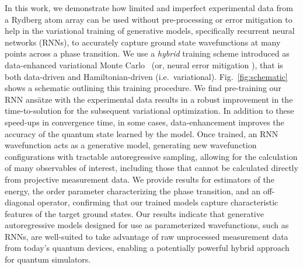 \documentclass[twocolumn,
                showpacs,
                nofootinbib,
                nobibnotes,
                aps,
                superscriptaddress,
                amssymb,
                amsmath,
                floatfix,
                reprint,
                prx, 
                notitlepage,
                showkeys,
                10pt,
		]{revtex4-2}
\begin{document}
In this work, we demonstrate how limited and imperfect experimental data from a Rydberg atom array can be used without pre-processing or error mitigation to help in the variational training of generative models, specifically recurrent neural networks (RNNs), to accurately capture ground state wavefunctions at many points across a phase transition. 
We use a \emph{hybrid} training scheme introduced as data-enhanced variational Monte Carlo~\cite{czischek2022data} (or, neural error mitigation \cite{bennewitz2022neural}), that is both data-driven and Hamiltonian-driven (i.e.~variational). Fig.~\ref{fig:schematic} shows a schematic outlining this training procedure.
We find pre-training our RNN ans\"atze with the experimental data results in a robust improvement in the time-to-solution for the subsequent variational optimization.  
In addition to these speed-ups in convergence time, in some cases, data-enhancement improves the accuracy of the quantum state learned by the model. 
Once trained, an RNN wavefunction acts as a generative model, generating new wavefunction configurations with tractable autoregressive sampling, allowing for the calculation of many observables of interest, including those that cannot be calculated directly from projective measurement data. We provide results for estimators of the energy, the order parameter characterizing the phase transition, and an off-diagonal operator, confirming that our trained models capture characteristic features of the target ground states.
Our results indicate that generative autoregressive models designed for use as parameterized wavefunctions, such as RNNs, are well-suited to take advantage of raw unprocessed measurement data from today's quantum devices, enabling a potentially powerful hybrid approach for quantum simulators.





%
\end{document}
